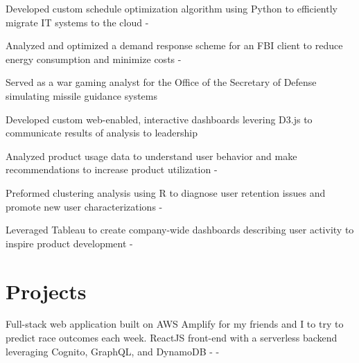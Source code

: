 \documentclass[]{plushcv}
\begin{document}
\begin{minipage}[t]{0.7\textwidth}
\begin{tightemize}
\sectionsep
\item Developed custom schedule optimization algorithm using Python to 
efficiently migrate IT systems to the cloud \python - \dthree\\
\item Analyzed and optimized a demand response scheme for an FBI client to
 reduce energy consumption and minimize costs \python - \dthree\\
\item Served as a war gaming analyst for the Office of the Secretary of Defense 
simulating missile guidance systems 
\item Developed custom web-enabled, interactive dashboards levering D3.js to 
communicate results of analysis to leadership \dthree\\
\end{tightemize}
\sectionsep

\begin{tightemize}
\sectionsep
\item Analyzed product usage data to understand user behavior and make 
recommendations to increase product utilization \Rlang - \mysql\\
\item Preformed clustering analysis using R to diagnose user retention 
issues and promote new user characterizations \Rlang - \mysql \\
\item Leveraged Tableau to create company-wide dashboards describing user 
activity to inspire product development \tableau - \mysql\\
\end{tightemize}
\sectionsep



\section{Projects}

\begin{tightemize}
\item Full-stack web application built on AWS Amplify for my friends and I to 
try to predict race outcomes each week. ReactJS front-end with a serverless 
backend leveraging Cognito, GraphQL, and DynamoDB \aws - \react - \graphql \\
\end{tightemize}
\sectionsep


\end{minipage}
\end{document}

